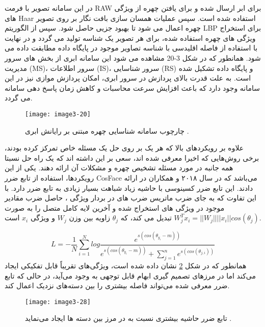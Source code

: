 \noindent
در این سامانه تصویر با فرمت RAW برای ابر ارسال شده و برای یافتن چهره از ویژگی های Haar استفاده شده است. سپس عملیات همسان سازی بافت نگار بر روی تصویر چهره اعمال می شود تا بهبود جزیی حاصل شود. سپس از الگوریتم LBP برای استخراج ویژگی های چهره استفاده شده، برای هر تصویر یک شناسه تولید می گردد و در نهایت با استفاده از فاصله اقلیدسی با شناسه تصاویر موجود در پایگاه داده مطابقت داده می شود. همانطور که در شکل 3-20 مشاهده می شود این سامانه ابری از بخش های سرور مدیریت (MS)، سرور اطلاعات (IS)، سرور شناسایی (RS) و پایگاه داده تشکیل شده است. به علت قدرت بالای پردازش در سرور ابری، امکان پردازش موازی نیز در این سامانه وجود دارد که باعث افزایش سرعت محاسبات و کاهش زمان پاسخ دهی سامانه می گردد. 
\begin{figure}[h]
\centering
  \texttt{[image: image3-20]}
  \caption{چارچوب سامانه شناسایی چهره مبتنی بر رایانش ابری \cite{ref1}.}
  \label{image2-1}
\end{figure}
\noindent
علاوه بر رویکردهای بالا که هر یک بر روی حل یک مسئله خاص تمرکز کرده بودند، برخی روش‌هایی که اخیرا معرفی شده اند، سعی بر این داشته اند که یک راه حل نسبتا همه جانبه در مورد مسئله تشخیص چهره و مشکلات آن ارائه دهند. یکی از این رویکردها، استفاده از تابع ضرر CosFace می‌باشد که در سال ۲۰۱۸  و همکاران در \cite{wang2018cosface} ارائه دادند. این تابع ضرر کسینوسی با حاشیه زیاد  شباهت بسیار زیادی به تابع ضرر  دارد. با این تفاوت که به جای ضرب ماتریس ضرب های  در بردار ویژگی ، حاصل ضرب مقادیر موجود در ویژگی های استخراج شده و آخرین لایه کامل
متصل را به صورت
$W_j^T x_i = ||W_j|| ||x_i|| cos(θ_j)$
تبدیل می کند، که $\theta_j$ زاویه بین وزن $W_j$ و ویژگی $x_i$ است.

\begin{equation}\label{eq4-2}
L = - \frac{1}{N} \sum_{i=1}^{N} log \frac{e^{s(cos(\theta_{y_i}-m))}}{e^{s(cos(\theta_{y_i}-m))} + \sum_{j=1}^{n} e^{s(cos(\theta_{j, i}))}}
\end{equation}
\noindent
همانطور که در شکل \ref{image3-28} نشان داده شده است،  ویژگی‌های تقریباً قابل تفکیکی ایجاد می‌کند اما در مرزهای تصمیم گیری ابهام قابل توجهی به وجود می‌آید، در حالی که تابع ضرر معرفی شده می‌تواند فاصله بیشتری را بین دسته‌های نزدیک اعمال کند.
\begin{figure}[h]
\centering
  \texttt{[image: image3-28]}
  \caption{تابع ضرر  حاشیه بیشتری نسبت به  در مرز بین دسته ها ایجاد می‌نماید \cite{wang2018cosface}.}
  \label{image3-28}
\end{figure}


